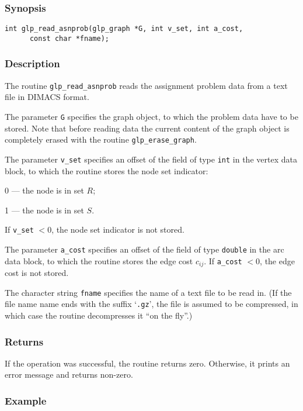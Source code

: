 \documentclass[dvipdfm,11pt]{report}
\begin{document}
\subsubsection*{Synopsis}

\begin{verbatim}
int glp_read_asnprob(glp_graph *G, int v_set, int a_cost,
      const char *fname);
\end{verbatim}

\subsubsection*{Description}

The routine \verb|glp_read_asnprob| reads the assignment problem data
from a text file in DIMACS format.

The parameter \verb|G| specifies the graph object, to which the problem
data have to be stored. Note that before reading data the current
content of the graph object is completely erased with the routine
\verb|glp_erase_graph|.

The parameter \verb|v_set| specifies an offset of the field of type
\verb|int| in the vertex data block, to which the routine stores the
node set indicator:

0 --- the node is in set $R$;

1 --- the node is in set $S$.

\noindent
If \verb|v_set| $<0$, the node set indicator is not stored.

The parameter \verb|a_cost| specifies an offset of the field of type
\verb|double| in the arc data block, to which the routine stores the
edge cost $c_{ij}$. If \verb|a_cost| $<0$, the edge cost is not stored.

The character string \verb|fname| specifies the name of a text file to
be read in. (If the file name name ends with the suffix `\verb|.gz|',
the file is assumed to be compressed, in which case the routine
decompresses it ``on the fly''.)

\subsubsection*{Returns}

If the operation was successful, the routine returns zero. Otherwise,
it prints an error message and returns non-zero.

\newpage

\subsubsection*{Example}
\end{document}
